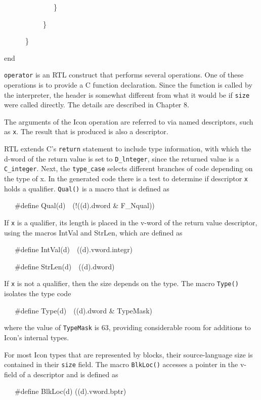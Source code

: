 {\ttfamily\mdseries
\ \ \ \ \ \ \ \ \ \ \ \ \ \ \}}


\ \ \ \ \ \ \ \ \ \ \ \}


\ \ \ \ \ \ \}

{\ttfamily
end}


\texttt{operator} is an RTL construct that performs several
operations. One of these operations is to provide a C function
declaration. Since the function is called by the interpreter, the
header is somewhat different from what it would be if \texttt{size}
were called directly. The details are described in Chapter 8.

The arguments of the Icon operation are referred to via named
descriptors, such as \texttt{x}. The result that is produced is also a
descriptor.

RTL extends C's \texttt{return} statement to include type information,
with which the d-word of the return value is set to
\texttt{D\_lnteger}, since the returned value is a
\texttt{C\_integer}. Next, the \texttt{type\_case} selects different
branches of code depending on the type of x. In the generated code
there is a test to determine if descriptor \texttt{x} holds a
qualifier. \texttt{Qual()} is a macro that is defined as

{\ttfamily\mdseries
\ \ \ \#define Qual(d)\ \ (!((d).dword \& F\_Nqual))}

If \texttt{x} is a qualifier, its length is placed in the v-word of
the return value descriptor, using the macros IntVal and StrLen, which
are defined as

{\ttfamily\mdseries
\ \ \ \#define IntVal(d)\ \ ((d).vword.integr)}

{\ttfamily\mdseries
\ \ \ \#define StrLen(d)\ \ ((d).dword)}


If \texttt{x} is not a qualifier, then the size depends on the
type. The macro \texttt{Type()} isolates the type code

{\ttfamily\mdseries
\ \ \ \#define Type(d)\ \ ((d).dword \& TypeMask)}

\noindent where the value of \texttt{TypeMask} is 63, providing
considerable room for additions to Icon's internal types.

For most Icon types that are represented by blocks, their
source-language size is contained in their \texttt{size} field. The
macro \texttt{BlkLoc()} accesses a pointer in the v-field of a
descriptor and is defined as

{\ttfamily\mdseries
\ \ \ \#define BlkLoc(d) ((d).vword.bptr)}

